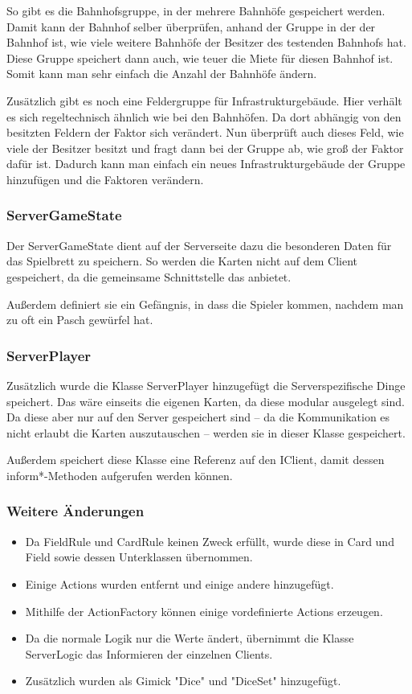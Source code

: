 \documentclass[a4paper,10pt]{article}
\begin{document}
So gibt es die Bahnhofsgruppe, in der mehrere Bahnhöfe gespeichert werden. Damit kann der Bahnhof selber überprüfen, anhand der Gruppe in der der Bahnhof ist, wie viele weitere Bahnhöfe der Besitzer des testenden Bahnhofs hat. Diese Gruppe speichert dann auch, wie teuer die Miete für diesen Bahnhof ist. Somit kann man sehr einfach die Anzahl der Bahnhöfe ändern.

Zusätzlich gibt es noch eine Feldergruppe für Infrastrukturgebäude. Hier verhält es sich regeltechnisch ähnlich wie bei den Bahnhöfen. Da dort abhängig von den besitzten Feldern der Faktor sich verändert. Nun überprüft auch dieses Feld, wie viele der Besitzer besitzt und fragt dann bei der Gruppe ab, wie groß der Faktor dafür ist. Dadurch kann man einfach ein neues Infrastrukturgebäude der Gruppe hinzufügen und die Faktoren verändern.
\subsubsection{ServerGameState}
Der ServerGameState dient auf der Serverseite dazu die besonderen Daten für das Spielbrett zu speichern. So werden die Karten nicht auf dem Client gespeichert, da die gemeinsame Schnittstelle das anbietet.

Außerdem definiert sie ein Gefängnis, in dass die Spieler kommen, nachdem man zu oft ein Pasch gewürfel hat.

\subsubsection{ServerPlayer}
Zusätzlich wurde die Klasse ServerPlayer hinzugefügt die Serverspezifische Dinge speichert. Das wäre einseits die eigenen Karten, da diese modular ausgelegt sind. Da diese aber nur auf den Server gespeichert sind -- da die Kommunikation es nicht erlaubt die Karten auszutauschen -- werden sie in dieser Klasse gespeichert.

Außerdem speichert diese Klasse eine Referenz auf den IClient, damit dessen inform*-Methoden aufgerufen werden können.

\subsubsection{Weitere Änderungen}
\begin{itemize}
\item Da FieldRule und CardRule keinen Zweck erfüllt, wurde diese in Card und Field sowie dessen Unterklassen übernommen.
\item Einige Actions wurden entfernt und einige andere hinzugefügt.
\item Mithilfe der ActionFactory können einige vordefinierte Actions erzeugen.
\item Da die normale Logik nur die Werte ändert, übernimmt die Klasse ServerLogic das Informieren der einzelnen Clients.
\item Zusätzlich wurden als Gimick "Dice" und "DiceSet" hinzugefügt.
\end{itemize}
\end{document}
